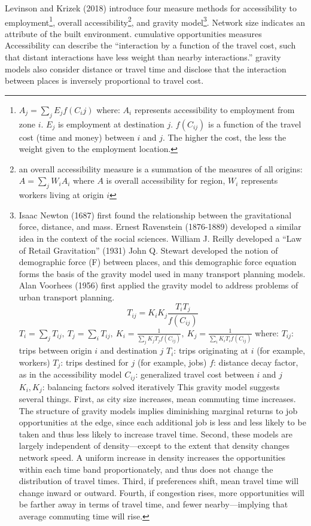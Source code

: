 \documentclass[12pt,]{article}
\let\rmarkdownfootnote\footnote%
\def\footnote{\protect\rmarkdownfootnote}
\begin{document}
Levinson and Krizek (2018) introduce four measure methods for
accessibility to employment\footnote{\(A_j=\sum_jE_jf(C_ij)\) where:
  \(A_i\) represents accessibility to employment from zone \(i\).
  \(E_j\) is employment at destination \(j\). \(f(C_{ij})\) is a
  function of the travel cost (time and money) between \(i\) and \(j\).
  The higher the cost, the less the weight given to the employment
  location.}, overall accessibility\footnote{an overall accessibility
  measure is a summation of the measures of all origins:
  \(A =\sum_jW_i A_i\) where \(A\) is overall accessibility for region,
  \(W_i\) represents workers living at origin \(i\)}, and gravity
model\footnote{Isaac Newton (1687) first found the relationship between
  the gravitational force, distance, and mass. Ernest Ravenstein
  (1876-1889) developed a similar idea in the context of the social
  sciences. William J. Reilly developed a ``Law of Retail Gravitation''
  (1931) John Q. Stewart developed the notion of demographic force (F)
  between places, and this demographic force equation forms the basis of
  the gravity model used in many transport planning models. Alan
  Voorhees (1956) first applied the gravity model to address problems of
  urban transport planning. \[T_{ij}=K_iK_j\frac{T_iT_j}{f(C_{ij})}\]
  \(T_i=\sum_jT_{ij},\ T_j=\sum_iT_{ij},\ K_i=\frac1{\sum_jK_jT_jf(C_{ij})},\ K_j=\frac1{\sum_iK_iT_if(C_{ij})}\)
  where: \(T_{ij}\): trips between origin \(i\) and destination \(j\)
  \(T_i\): trips originating at \(i\) (for example, workers) \(T_j\):
  trips destined for \(j\) (for example, jobs) \(f\): distance decay
  factor, as in the accessibility model \(C_{ij}\): generalized travel
  cost between \(i\) and \(j\) \(K_i, K_j\): balancing factors solved
  iteratively This gravity model suggests several things. First, as city
  size increases, mean commuting time increases. The structure of
  gravity models implies diminishing marginal returns to job
  opportunities at the edge, since each additional job is less and less
  likely to be taken and thus less likely to increase travel time.
  Second, these models are largely independent of density---except to
  the extent that density changes network speed. A uniform increase in
  density increases the opportunities within each time band
  proportionately, and thus does not change the distribution of travel
  times. Third, if preferences shift, mean travel time will change
  inward or outward. Fourth, if congestion rises, more opportunities
  will be farther away in terms of travel time, and fewer
  nearby---implying that average commuting time will rise.}. Network
size indicates an attribute of the built environment. cumulative
opportunities measures Accessibility can describe the ``interaction by a
function of the travel cost, such that distant interactions have less
weight than nearby interactions.'' gravity models also consider distance
or travel time and disclose that the interaction between places is
inversely proportional to travel cost.
\end{document}
